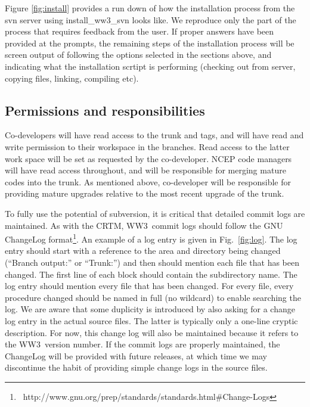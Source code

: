 \documentclass[12pt]{article}
\newcommand{\ws}{WW3}
\newcommand{\file}{\sf}
\begin{document}
Figure \ref{fig:install} provides a run down of how the installation process from the svn server using
{\file install\_ww3\_svn} looks like. We reproduce only the part of the process that requires 
feedback from the user. If proper answers have been provided at the prompts, the remaining steps of the installation
process will be screen output of following the options selected in the sections above,
and indicating what the installation scrtipt is performing (checking out from server,
copying files, linking, compiling etc).

\pagebreak

\vspace{\baselineskip}
\noindent
\subsection{Permissions and responsibilities}

Co-developers will have read access to the {\file trunk} and {\file tags}, and
will have read and write permission to their workspace in the {\file
branches}. Read access to the latter work space will be set as requested by
the co-developer. NCEP code managers will have read access throughout, and
will be responsible for merging mature codes into the {\file trunk}. As
mentioned above, co-developer will be responsible for providing mature
upgrades relative to the most recent upgrade of the {\file trunk}.

To fully use the potential of subversion, it is critical that detailed commit
logs are maintained. As with the CRTM, \ws\ commit logs should follow the GNU
ChangeLog format\footnote{
~http://www.gnu.org/prep/standards/standards.html\#Change-Logs}. An example of
a log entry is given in Fig.~\ref{fig:log}. The log entry should start with a 
reference to the area and directory being changed (``Branch output:'' or ``Trunk:'') 
and then should mention each
file that has been changed. The first line of each block should contain the
subdirectory name. The log entry should mention every file that has been
changed. For every file, every procedure changed should be named in full (no
wildcard) to enable searching the log. We are aware that some duplicity is
introduced by also asking for a change log entry in the actual source
files. The latter is typically only a one-line cryptic description. For now,
this change log will also be maintained because it refers to the \ws\ version
number. If the commit logs are properly maintained, the ChangeLog will be
provided with future releases, at which time we may discontinue the habit of
providing simple change logs in the source files.
\end{document}
